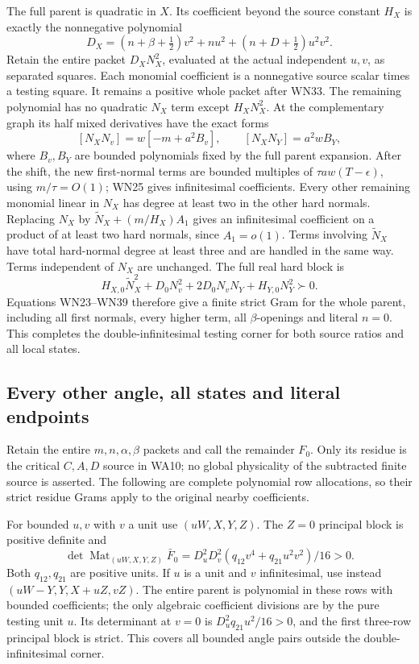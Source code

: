 The full parent is quadratic in \(X\). Its coefficient beyond
the source constant \(H_X\) is exactly the nonnegative polynomial
\[
 D_X=(n+\beta+\tfrac12)v^2+nu^2+
                         (n+D+\tfrac12)u^2v^2 .
 \tag{WN37}
\]
Retain the entire packet \(D_XN_X^2\), evaluated at the actual
independent \(u,v\), as separated squares. Each monomial coefficient
is a nonnegative source scalar times a testing square. It remains
a positive whole packet after WN33.
The remaining polynomial has no quadratic \(N_X\) term except
\(H_XN_X^2\). At the complementary graph its half mixed
derivatives have the exact forms
\[
 [N_XN_v]=w[-m+a^2B_v],\qquad
 [N_XN_Y]=a^2wB_Y,
 \tag{WN38}
\]
where \(B_v,B_Y\) are bounded polynomials fixed by the full
parent expansion. After the shift, the new first-normal terms
are bounded multiples of \(\tau aw(T-\epsilon)\), using
\(m/\tau=O(1)\); WN25 gives infinitesimal coefficients.
Every other remaining monomial linear in \(N_X\) has degree at
least two in the other hard normals. Replacing \(N_X\) by
\(\widetilde N_X+(m/H_X)A_1\) gives an infinitesimal coefficient
on a product of at least two hard normals, since \(A_1=o(1)\).
Terms involving \(\widetilde N_X\) have total hard-normal
degree at least three and are handled in the same way.
Terms independent of \(N_X\) are unchanged. The full real hard block is
\[
 H_{X,0}\widetilde N_X^2+
       D_0N_v^2+2D_0N_vN_Y+H_{Y,0}N_Y^2\succ0.
 \tag{WN39}
\]
Equations WN23--WN39 therefore give a finite strict Gram for
the whole parent, including all first normals, every higher term,
all \(\beta\)-openings and literal \(n=0\).
This completes the double-infinitesimal testing corner for both
source ratios and all local states.

\subsection{Every other angle, all states and literal endpoints}

Retain the entire \(m,n,\alpha,\beta\) packets and call the
remainder \(F_0\). Only its residue is the critical \(C,A,D\)
source in WA10; no global physicality of the subtracted finite
source is asserted. The following are complete polynomial row
allocations, so their strict residue Grams apply to the original
nearby coefficients.

For bounded \(u,v\) with \(v\) a unit use \((uW,X,Y,Z)\).
The \(Z=0\) principal block is positive definite and
\[
 \det\operatorname{Mat}_{(uW,X,Y,Z)}\bar F_0
 =D_u^2D_v^2(q_{12}v^4+q_{21}u^2v^2)/16>0.
 \tag{WN40}
\]
Both \(q_{12},q_{21}\) are positive units. If \(u\) is a unit
and \(v\) infinitesimal, use instead
\((uW-Y,Y,X+uZ,vZ)\). The entire parent is polynomial in
these rows with bounded coefficients; the only algebraic
coefficient divisions are by the pure testing unit \(u\).
Its determinant at \(v=0\) is
\(D_u^2q_{21}u^2/16>0\), and the first three-row principal block
is strict. This covers all bounded angle pairs outside the
double-infinitesimal corner.


